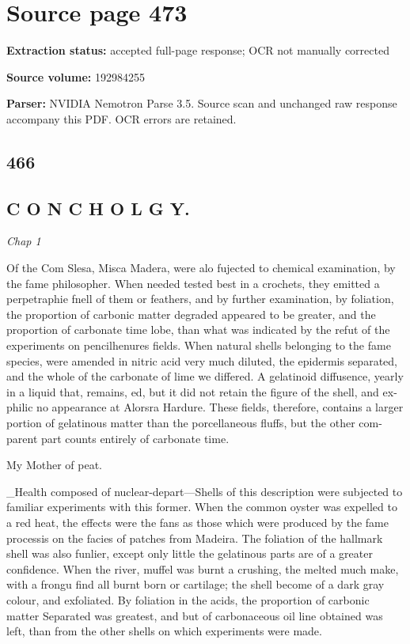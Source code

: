 \clearpage
\section{Source page 473}
\textbf{Extraction status:} accepted full-page response; OCR not manually corrected\par
\textbf{Source volume:} 192984255\par
\textbf{Parser:} NVIDIA Nemotron Parse 3.5. Source scan and unchanged raw response accompany this PDF. OCR errors are retained.\par\medskip
\subsection*{466}
\subsection*{C O N C H O L G Y.}
{\small\itshape Chap 1\par}\medskip
Of the Com Slesa, Misca Madera, were alo fujected to chemical examination, by the fame philosopher. When needed tested best in a crochets, they emitted a perpetraphie fnell of them or feathers, and by further examination, by foliation, the proportion of carbonic matter degraded appeared to be greater, and the proportion of carbonate time lobe, than what was indicated by the refut of the experiments on pencilhenures fields. When natural shells belonging to the fame species, were amended in nitric acid very much diluted, the epidermis separated, and the whole of the carbonate of lime we differed. A gelatinoid diffusence, yearly in a liquid that, remains, ed, but it did not retain the figure of the shell, and ex-philic no appearance at Alorsra Hardure. These fields, therefore, contains a larger portion of gelatinous matter than the porcellaneous fluffs, but the other com-parent part counts entirely of carbonate time.\par\medskip
My Mother of peat.\par\medskip
\_Health composed of nuclear-depart—Shells of this description were subjected to familiar experiments with this former. When the common oyster was expelled to a red heat, the effects were the fans as those which were produced by the fame processis on the facies of patches from Madeira. The foliation of the hallmark shell was also funlier, except only little the gelatinous parts are of a greater confidence. When the river, muffel was burnt a crushing, the melted much make, with a frongu find all burnt born or cartilage; the shell become of a dark gray colour, and exfoliated. By foliation in the acids, the proportion of carbonic matter Separated was greatest, and but of carbonaceous oil line obtained was left, than from the other shells on which experiments were made.\par\medskip

